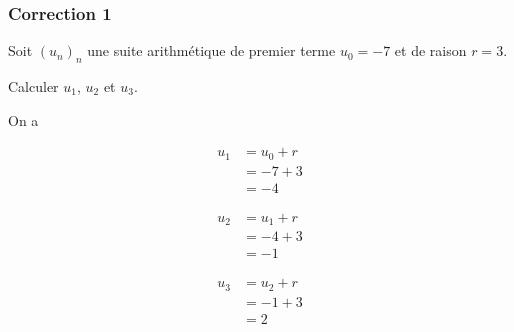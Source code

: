 \documentclass[15pt, mathserif]{beamer}
\begin{document}
\begin{frame}
\vspace{-10mm}
	\frametitle{Correction 1}
Soit $(u_n)_n$ une suite arithmétique de premier terme $u_0=-7$ et de raison $r=3$. 
 
 Calculer $u_1$, $u_2$ et $u_3$. 
 
 On a 
 \begin{minipage}{0.25\textwidth} 
 
 \begin{align*} 
 u_1 &= u_0+r \\ &= -7+3 \\ &=-4
 \end{align*} 
  
 \end{minipage} \hfil \begin{minipage}{0.25\textwidth} 
 
 \begin{align*} 
 u_2 &= u_1+r \\ &= -4+3 \\ &=-1
 \end{align*} 
 
 \end{minipage} \hfil \begin{minipage}{0.25\textwidth} 
 
 \begin{align*} 
 u_3 &= u_2+r \\ &= -1+3 \\ &=2
 \end{align*} 
 
 \end{minipage} 
\end{frame}
\end{document}
